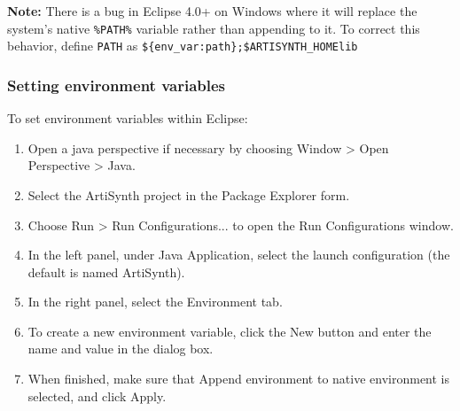 \ifWindows
\begin{sideblock}
{\bf Note:} There is a bug in Eclipse 4.0+ on Windows where it will replace 
the system's native {\tt \%PATH\%} variable rather than appending to it.  
To correct this behavior, define {\tt PATH} as 
{\tt \$\{env\_var:path\};\$ARTISYNTH\_HOME\SEP lib\SEP \ARCH{}} 
\end{sideblock}
\fi %
\fi

\subsubsection {Setting environment variables}
\label{SettingEnvironmentVariables}

To set environment variables within Eclipse:

\begin{enumerate}

\item Open a java perspective if necessary by choosing
  {\sf Window > Open Perspective > Java}.

\item Select the ArtiSynth project in the {\sf Package Explorer} form.

\item Choose {\sf Run > Run Configurations...} to open the {\sf Run
  Configurations} window.

\item In the left panel, under {\sf Java Application}, select 
the launch configuration (the default is named {\sf ArtiSynth}).

\item In the right panel, select the {\sf Environment} tab.

\item To create a new environment variable, click the {\sf New} button and
  enter the name and value in the dialog box. 

\item When finished, make sure that {\sf Append environment to native
  environment} is selected, and click {\sf Apply}.

\end{enumerate}


